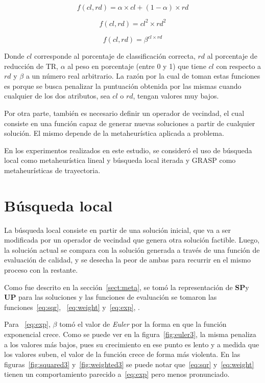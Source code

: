 \documentclass{ci5652}
\begin{document}
\begin{equation}\label{eq:weight}
f(cl,rd) = \alpha\times cl + (1 - \alpha)\times rd
\end{equation}

\begin{equation}\label{eq:sqr}
f(cl,rd) = cl^{2}\times rd^{2}
\end{equation}

\begin{equation}\label{eq:exp}
f(cl,rd) = \beta^{cl\times rd}
\end{equation}

Donde $cl$ corresponde al porcentaje de classificación correcta, $rd$ al porcentaje de reducción de TR, $\alpha$ al peso en porcentaje (entre 0 y 1) que tiene $cl$ con respecto a $rd$ y $\beta$ a un número real arbitrario. La razón por la cual de toman estas funciones es porque se busca penalizar la puntuación obtenida por las mismas cuando cualquier de los dos atributos, sea $cl$ o $rd$, tengan valores muy bajos.

Por otra parte, también es necesario definir un operador de vecindad, el cual consiste en una función capaz de generar nuevas soluciones a partir de cualquier solución. El mismo depende de la metaheurística aplicada a problema.

En los experimentos realizados en este estudio, se consideró el uso de búsqueda local como metaheurística lineal y búsqueda local iterada y GRASP como metaheurísticas de trayectoria.

\section{Búsqueda local}\label{sect:ls}

La búsqueda local consiste en partir de una solución inicial, que va a ser modificada por un operador de vecindad que genera otra solución factible. Luego, la solución actual se compara con la solución generada a través de una función de evaluación de calidad, y se desecha la peor de ambas para recurrir en el mismo proceso con la restante.

Como fue descrito en la sección~\ref{sect:meta}, se tomó la representación de \textbf{SP}y \textbf{UP} para las soluciones y las funciones de evaluación se tomaron las funciones~\ref{eq:sqr}, ~\ref{eq:weight} y~\ref{eq:exp}, .

Para ~\ref{eq:exp}, $\beta$ tomó el valor de \textit{Euler} por la forma en que la función exponencial crece. Como se puede ver en la figura~\ref{fig:euler3}, la misma penaliza a los valores más bajos, pues su crecimiento en ese punto es lento y a medida que los valores suben, el valor de la función crece de forma más violenta. En las figuras~\ref{fig:squared3} y~\ref{fig:weighted3} se puede notar que~\ref{eq:sqr} y~\ref{eq:weight} tienen un comportamiento parecido a~\ref{eq:exp} pero menos pronunciado. 
\end{document}
